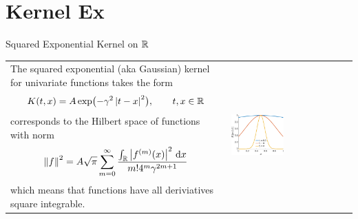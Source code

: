 \documentclass[10pt,compress,xcolor={usenames,dvipsnames},aspectratio=169]{beamer}
\begin{document}
\section{Kernel Ex}
\begin{frame}{Squared Exponential Kernel on $\mathbb{R}$}
	
\begin{tabular}{m{}m{}}
	The squared exponential (aka Gaussian) kernel for univariate functions takes the form 
	\[
	K(t,x) = A \exp\bigl(-\gamma^2\left \lvert t-x \right \rvert^2 \bigr) , \qquad t, x \in \mathbb{R}
	\]
corresponds to the Hilbert space of functions with norm \cite[(6.18)]{RasWil06a}
\begin{equation*}
\left \lVert f \right \rVert_{{}}^2 = A\sqrt{\pi} \sum_{m=0}^\infty\frac{\int_{\mathbb{R}} \left \lvert f^{(m)}(x) \right \rvert^2 \, {\rm d} x}{m! 4^m \gamma^{2m+1}}
\end{equation*}
which means that functions  have all deriviatives square integrable.
&
\includegraphics[width=0.45\textwidth]{RK-sqexpker.eps}
\end{tabular}
\end{frame}
\end{document}
